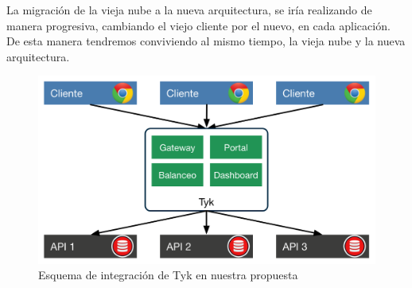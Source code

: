 La migración de la vieja nube a la nueva arquitectura, se iría realizando de manera progresiva, cambiando el viejo cliente por el nuevo, en cada aplicación.  De esta manera tendremos conviviendo al mismo tiempo, la vieja nube y la nueva arquitectura.

\begin{figure}[H]
  \includegraphics[width=\linewidth]{src/images/03-capitulo-3/tecnologias/tyk/tyk-integracion-arquitectura.png}
  \caption{Esquema de integración de Tyk en nuestra propuesta}
  \label{fig:integracion-tyk-arquitectura}
\end{figure}
